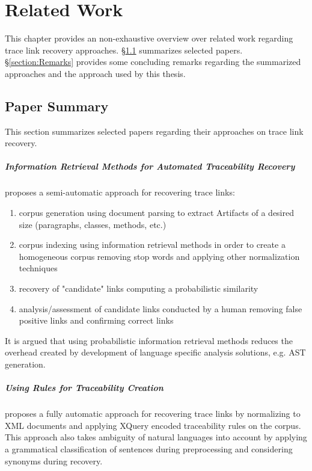 \chapter{Related Work}
\label{chapter:RelatedWork}
This chapter provides an non-exhaustive overview over related work regarding trace link recovery approaches.
§\ref{section:PaperSummary} summarizes selected papers.
§\ref{section:Remarks} provides some concluding remarks regarding the summarized approaches and the approach used by this thesis.

\section{Paper Summary}
\label{section:PaperSummary}
This section summarizes selected papers regarding their approaches on trace link recovery.

\paragraph*{Information Retrieval Methods for Automated Traceability Recovery}
\cite{DeLucia2012} 
proposes a semi-automatic approach for recovering trace links:
\begin{enumerate}
\item
corpus generation using document parsing to extract \glspl{Artifact} of a desired size (paragraphs, classes, methods, etc.)
\item
corpus indexing using information retrieval methods in order to create a homogeneous corpus removing stop words and applying other normalization techniques
\item
recovery of "candidate" links computing a probabilistic similarity
\item
analysis/assessment of candidate links conducted by a human removing false positive links and confirming correct links
\end{enumerate}
It is argued that using probabilistic information retrieval methods reduces the  overhead created by development of language specific analysis solutions, e.g. \gls{AST} generation.

\paragraph*{Using Rules for Traceability Creation} 
\cite{Zisman2012}
proposes a fully automatic approach for recovering trace links by normalizing to \gls{XML} documents and applying XQuery encoded traceability rules on the corpus.
This approach also takes ambiguity of natural languages into account by applying a grammatical classification of sentences during preprocessing and considering synonyms during recovery.

